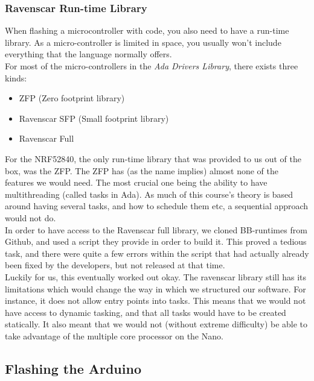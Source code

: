 \documentclass{article}
\begin{document}
\subsubsection{Ravenscar Run-time Library}

When flashing a microcontroller with code, you also need to have a run-time library. As a micro-controller is limited in space, you usually won't include everything that the language normally offers.\\ 

For most of the micro-controllers in the \textit{Ada Drivers Library}, there exists three kinds:
\begin{itemize}
  \item{ZFP (Zero footprint library)}
  \item{Ravenscar SFP (Small footprint library)}
  \item{Ravenscar Full}
\end{itemize}

For the NRF52840, the only run-time library that was provided to us out of the box, was the ZFP. The ZFP has (as the name implies) almost none of the features we would need. The most crucial one being the ability to have multithreading (called tasks in Ada). As much of this course's theory is based around having several tasks, and how to schedule them etc, a sequential approach would not do.\\ 

In order to have access to the Ravenscar full library, we cloned BB-runtimes from Github, and used a script they provide in order to build it. This proved a tedious task, and there were quite a few errors within the script that had actually already been fixed by the developers, but not released at that time.\\ 
Luckily for us, this eventually worked out okay. The ravenscar library still has its limitations which would change the way in which we structured our software. For instance, it does not allow entry points into tasks. This means that we would not have access to dynamic tasking, and that all tasks would have to be created statically. It also meant that we would not (without extreme difficulty) be able to take advantage of the multiple core processor on the Nano.\\

\subsection{Flashing the Arduino}
\end{document}
